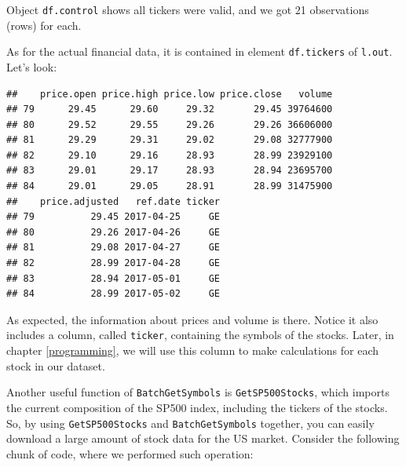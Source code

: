 \documentclass[11pt,]{book}
\newenvironment{Shaded}{\begin{snugshade}}{\end{snugshade}}
\newcommand{\KeywordTok}[1]{\textcolor[rgb]{0.27,0.27,0.27}{\textbf{#1}}}
\newcommand{\DataTypeTok}[1]{\textcolor[rgb]{0.27,0.27,0.27}{#1}}
\newcommand{\DecValTok}[1]{\textcolor[rgb]{0.06,0.06,0.06}{#1}}
\newcommand{\StringTok}[1]{\textcolor[rgb]{0.5,0.5,0.5}{#1}}
\newcommand{\CommentTok}[1]{\textcolor[rgb]{0.56,0.35,0.01}{\textit{#1}}}
\newcommand{\OperatorTok}[1]{\textcolor[rgb]{0.81,0.36,0.00}{\textbf{#1}}}
\newcommand{\NormalTok}[1]{#1}
\begin{document}
Object \texttt{df.control} shows all tickers were valid, and we got 21
observations (rows) for each.

As for the actual financial data, it is contained in element
\texttt{df.tickers} of \texttt{l.out}. Let's look:

\begin{Shaded}
\end{Shaded}

\begin{verbatim}
##    price.open price.high price.low price.close   volume
## 79      29.45      29.60     29.32       29.45 39764600
## 80      29.52      29.55     29.26       29.26 36606000
## 81      29.29      29.31     29.02       29.08 32777900
## 82      29.10      29.16     28.93       28.99 23929100
## 83      29.01      29.17     28.93       28.94 23695700
## 84      29.01      29.05     28.91       28.99 31475900
##    price.adjusted   ref.date ticker
## 79          29.45 2017-04-25     GE
## 80          29.26 2017-04-26     GE
## 81          29.08 2017-04-27     GE
## 82          28.99 2017-04-28     GE
## 83          28.94 2017-05-01     GE
## 84          28.99 2017-05-02     GE
\end{verbatim}

As expected, the information about prices and volume is there. Notice it
also includes a column, called \texttt{ticker}, containing the symbols
of the stocks. Later, in chapter \ref{programming}, we will use this
column to make calculations for each stock in our dataset.

Another useful function of \texttt{BatchGetSymbols} is
\texttt{GetSP500Stocks}, which imports the current composition of the
SP500 index, including the tickers of the stocks. So, by using
\texttt{GetSP500Stocks} and \texttt{BatchGetSymbols} together, you can
easily download a large amount of stock data for the US market. Consider
the following chunk of code, where we performed such operation:

\begin{Shaded}
\end{Shaded}
\end{document}
